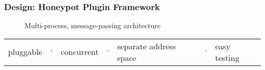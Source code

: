 \begin{frame}
\frametitle{Design: Honeypot Plugin Framework}

\begin{figure}
\centering
\caption{Multi-process, message-passing architecture}
{%
\scalebox{0.53}{}
}
\end{figure}

\centering
\begin{tabular}{l l l l l l l}
pluggable & $\cdot$ & concurrent & $\cdot$ & separate address space & $\cdot$ & easy testing \\
\end{tabular}

\end{frame}
